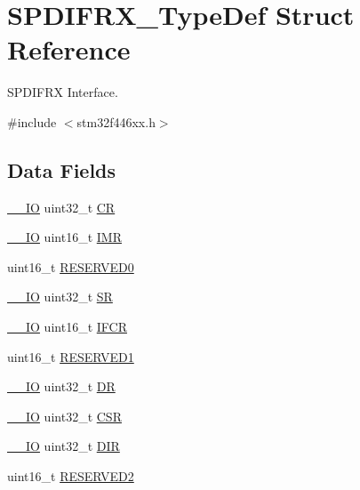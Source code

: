 \hypertarget{struct_s_p_d_i_f_r_x___type_def}{}\section{S\+P\+D\+I\+F\+R\+X\+\_\+\+Type\+Def Struct Reference}
\label{struct_s_p_d_i_f_r_x___type_def}


S\+P\+D\+I\+F\+RX Interface.  




{\ttfamily \#include $<$stm32f446xx.\+h$>$}

\subsection*{Data Fields}
\begin{DoxyCompactItemize}
\item 
\mbox{\hyperlink{core__sc300_8h_aec43007d9998a0a0e01faede4133d6be}{\+\_\+\+\_\+\+IO}} uint32\+\_\+t \mbox{\hyperlink{struct_s_p_d_i_f_r_x___type_def_ab40c89c59391aaa9d9a8ec011dd0907a}{CR}}
\item 
\mbox{\hyperlink{core__sc300_8h_aec43007d9998a0a0e01faede4133d6be}{\+\_\+\+\_\+\+IO}} uint16\+\_\+t \mbox{\hyperlink{struct_s_p_d_i_f_r_x___type_def_af29a8211f72bbda9316551ea02ae4b37}{I\+MR}}
\item 
uint16\+\_\+t \mbox{\hyperlink{struct_s_p_d_i_f_r_x___type_def_a149feba01f9c4a49570c6d88619f504f}{R\+E\+S\+E\+R\+V\+E\+D0}}
\item 
\mbox{\hyperlink{core__sc300_8h_aec43007d9998a0a0e01faede4133d6be}{\+\_\+\+\_\+\+IO}} uint32\+\_\+t \mbox{\hyperlink{struct_s_p_d_i_f_r_x___type_def_af6aca2bbd40c0fb6df7c3aebe224a360}{SR}}
\item 
\mbox{\hyperlink{core__sc300_8h_aec43007d9998a0a0e01faede4133d6be}{\+\_\+\+\_\+\+IO}} uint16\+\_\+t \mbox{\hyperlink{struct_s_p_d_i_f_r_x___type_def_a3a5a3a6154d16d0a8d2f25b0ac3237a7}{I\+F\+CR}}
\item 
uint16\+\_\+t \mbox{\hyperlink{struct_s_p_d_i_f_r_x___type_def_a8249a3955aace28d92109b391311eb30}{R\+E\+S\+E\+R\+V\+E\+D1}}
\item 
\mbox{\hyperlink{core__sc300_8h_aec43007d9998a0a0e01faede4133d6be}{\+\_\+\+\_\+\+IO}} uint32\+\_\+t \mbox{\hyperlink{struct_s_p_d_i_f_r_x___type_def_a3df0d8dfcd1ec958659ffe21eb64fa94}{DR}}
\item 
\mbox{\hyperlink{core__sc300_8h_aec43007d9998a0a0e01faede4133d6be}{\+\_\+\+\_\+\+IO}} uint32\+\_\+t \mbox{\hyperlink{struct_s_p_d_i_f_r_x___type_def_a876dd0a8546697065f406b7543e27af2}{C\+SR}}
\item 
\mbox{\hyperlink{core__sc300_8h_aec43007d9998a0a0e01faede4133d6be}{\+\_\+\+\_\+\+IO}} uint32\+\_\+t \mbox{\hyperlink{struct_s_p_d_i_f_r_x___type_def_a7bad11e3dbbfcc3c1317dc68669d3f51}{D\+IR}}
\item 
uint16\+\_\+t \mbox{\hyperlink{struct_s_p_d_i_f_r_x___type_def_a5573848497a716a9947fd87487709feb}{R\+E\+S\+E\+R\+V\+E\+D2}}
\end{DoxyCompactItemize}



